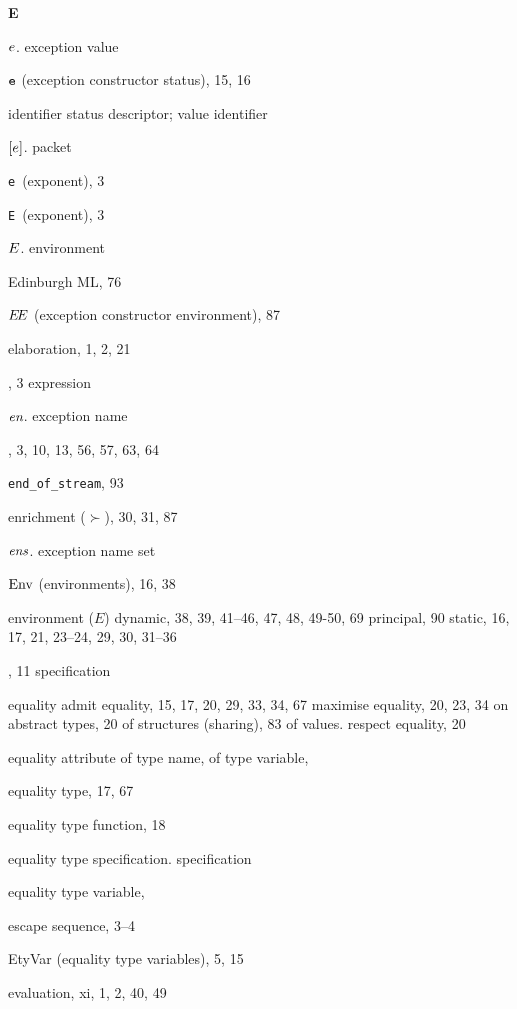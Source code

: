 \begin{theindex}
\indexspace
\parbox{65mm}{\hfil{\large\bf E}\hfil}
\indexspace
\item $e$. \see exception value
\item $\hbox{\tt e}$ (exception constructor status), 15, 16
\item \seealso identifier status descriptor; value identifier
\item $[e]$. \see packet 
\item \verb+e+\ (exponent), 3
\item \verb+E+\ (exponent), 3
\item $E$. \see environment 
\item Edinburgh ML, 76
\item $\mbox{$E\!E$}$ (exception constructor environment), 87
\item elaboration, 1, 2, 21
\item \ELSE, 3
\subitem \seealso expression
\item $\mbox{\it en}$. \see exception name
\item \END, 3, 10, 13, 56, 57, 63, 64
\item \verb+end_of_stream+, 93
\item enrichment ($\succ$), 30, 31, 87
\item $\mbox{\it ens}$. \see exception name set
\item ${\rm Env}$ (environments), 16, 38
\item environment ($E$)
\subitem dynamic, 38, 39, 41--46, 47, 48, 49-50, 69
\subitem principal, 90
\subitem static, 16, 17, 21, 23--24, 29, 30, 31--36
\item \EQTYPE, 11
\subitem \seealso specification
\item equality 
\subitem admit equality, 15, 17, 20, 29, 33, 34, 67
\subitem maximise equality, 20, 23, 34
\subitem on abstract types, 20
\subitem of structures (sharing), 83
\subitem of values. \see \boxml{=}
\subitem respect equality, 20
\item equality attribute 
\subitem of type name, \eqtynamerefs
\subitem of type variable, \eqtyvarrefs
\item equality type, 17, 67
\item equality type function, 18
\item equality type specification. \see specification
\item equality type variable, \eqtyvarrefs
\item escape sequence, 3--4
\item EtyVar (equality type variables), 5, 15 
\item evaluation, xi, 1, 2, 40, 49

\end{theindex}
